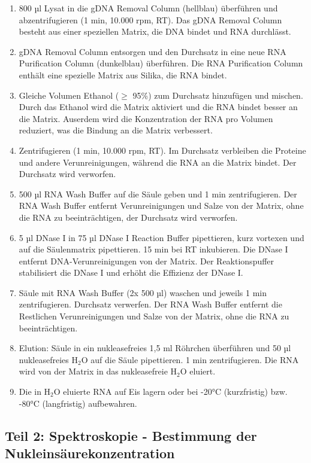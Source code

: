 \documentclass[a4paper,12pt]{article}
\begin{document}
\begin{enumerate}
    \item 800 µl Lysat in die gDNA Removal Column (hellblau) überführen und abzentrifugieren (1 min, 10.000 rpm, RT). Das gDNA Removal Column besteht aus einer speziellen Matrix, die DNA bindet und RNA durchlässt.
    \item gDNA Removal Column entsorgen und den Durchsatz in eine neue RNA Purification Column (dunkelblau) überführen. Die RNA Purification Column enthält eine spezielle Matrix aus Silika, die RNA bindet.
    \item Gleiche Volumen Ethanol (\(\geq\) 95\%) zum Durchsatz hinzufügen und mischen. Durch das Ethanol wird die Matrix aktiviert und die RNA bindet besser an die Matrix. Auserdem wird die Konzentration der RNA pro Volumen reduziert, was die Bindung an die Matrix verbessert.
    \item Zentrifugieren (1 min, 10.000 rpm, RT). Im Durchsatz verbleiben die Proteine und andere Verunreinigungen, während die RNA an die Matrix bindet. Der Durchsatz wird verworfen.
    \item 500 µl RNA Wash Buffer auf die Säule geben und 1 min zentrifugieren. Der RNA Wash Buffer entfernt Verunreinigungen und Salze von der Matrix, ohne die RNA zu beeinträchtigen, der Durchsatz wird verworfen.
    \item 5 µl DNase I in 75 µl DNase I Reaction Buffer pipettieren, kurz vortexen und auf die Säulenmatrix pipettieren. 15 min bei RT inkubieren. Die DNase I entfernt DNA-Verunreinigungen von der Matrix. Der Reaktionspuffer stabilisiert die DNase I und erhöht die Effizienz der DNase I.
    \item Säule mit RNA Wash Buffer (2x 500 µl) waschen und jeweils 1 min zentrifugieren. Durchsatz verwerfen. Der RNA Wash Buffer entfernt die Restlichen Verunreinigungen und Salze von der Matrix, ohne die RNA zu beeinträchtigen.
    \item Elution: Säule in ein nukleasefreies 1,5 ml Röhrchen überführen und 50 µl nukleasefreies H$_2$O auf die Säule pipettieren. 1 min zentrifugieren. Die RNA wird von der Matrix in das nukleasefreie H$_2$O eluiert.
    \item Die in H$_2$O eluierte RNA auf Eis lagern oder bei -20°C (kurzfristig) bzw. -80°C (langfristig) aufbewahren.
\end{enumerate}

\subsection*{Teil 2: Spektroskopie - Bestimmung der Nukleinsäurekonzentration}
\end{document}
